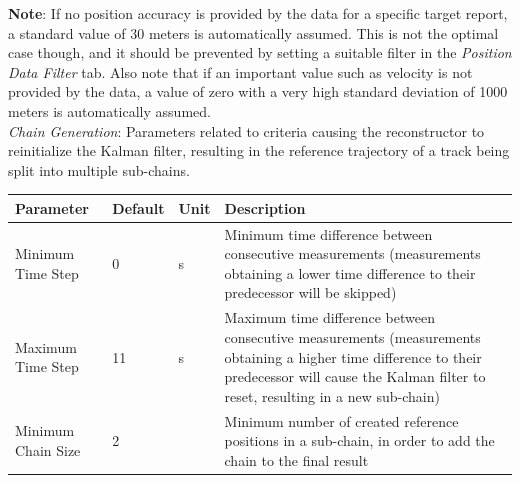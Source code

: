 \textbf{Note}: If no position accuracy is provided by the data for a specific target report, a standard value of 30 meters is
automatically assumed. This is not the optimal case though, and it should be prevented by setting a suitable filter 
in the \textit{Position Data Filter} tab. Also note that if an important value such as velocity is
not provided by the data, a value of zero with a very high standard deviation of 1000 meters is automatically assumed. \\

\textit{Chain Generation}: Parameters related to criteria causing the reconstructor to reinitialize the Kalman filter, 
resulting in the reference trajectory of a track being split into multiple sub-chains.
\begin{table}[H]
    \center
    \begin{tabularx}{\textwidth}{ | l | l | l | X |}
        \hline
        \textbf{Parameter} & \textbf{Default} & \textbf{Unit} & \textbf{Description} \\ \hline
        Minimum Time Step & 0 & s & Minimum time difference between consecutive measurements (measurements obtaining a 
            lower time difference to their predecessor will be skipped) \\ \hline
        Maximum Time Step & 11 & s & Maximum time difference between consecutive measurements (measurements obtaining a 
            higher time difference to their predecessor will cause the Kalman filter to reset, 
            resulting in a new sub-chain) \\ \hline
        Minimum Chain Size & 2 & & Minimum number of created reference positions in a sub-chain, in order to add the chain 
            to the final result \\ \hline
    \end{tabularx}
\end{table}

